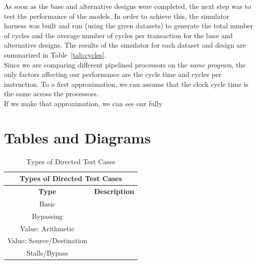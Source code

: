 \documentclass[10pt]{article}
\begin{document}
As soon as the base and alternative designs were completed, the next step was to test the performance of the models. In order to achieve this, the simulator harness was built and run (using the given datasets) to generate the total number of cycles and the average number of cycles per transaction for the base and alternative designs. The results of the simulator for each dataset and design are summarized in Table~\ref{tab:cycles}. \\

Since we are comparing different pipelined processors on the \textit{same program}, the only factors affecting our performance are the cycle time and cycles per instruction.
To a first approximation, we can assume that the clock cycle time is the same across the processors. \\

If we make that approximation, we can see our fully 


\pagebreak[4]

\section {Tables and Diagrams}


\begin{table}[h]
\begin{center}
\begin{tabular}{| c | c |}
\hline
\multicolumn{2}{|c|}{Types of Directed Test Cases}   \\
\hline
\textbf{Type}                         &    \textbf{Description}  	\\   \hline      
Basic            					  &           					\\
Bypassing                             &								\\
Value: Arithmetic           		  &          					\\        
Value: Source/Destination             & 							\\
Stalls/Bypass 						  & 							\\
\hline                                                 
\end{tabular}
\caption{Types of Directed Test Cases} 
\label{table:tests}
\end{center}
\end{table}


\end{document}
